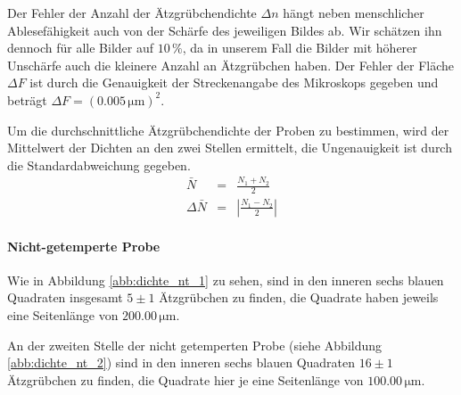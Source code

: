 \documentclass[12pt,a4paper]{scrartcl}
\numberwithin{equation}{section} %
\begin{document}
Der Fehler der Anzahl der Ätzgrübchendichte $\Delta n$ hängt neben
menschlicher Ablesefähigkeit auch von der Schärfe des jeweiligen Bildes
ab. Wir schätzen ihn dennoch für alle Bilder auf $10\,\%$, da in
unserem Fall die Bilder mit höherer Unschärfe auch die kleinere Anzahl
an Ätzgrübchen haben. Der Fehler der Fläche $\Delta F$ ist durch die
Genauigkeit der Streckenangabe des Mikroskops gegeben und beträgt
$\Delta F=(0.005 \mathrm{\, \mu m})^2$.

Um die durchschnittliche Ätzgrübchendichte der Proben zu bestimmen,
wird der Mittelwert der Dichten an den zwei Stellen ermittelt, die
Ungenauigkeit ist durch die Standardabweichung gegeben.
\begin{eqnarray}
    \bar{N} &=& \frac{N_1 + N_2}{2} \label{Nbar}\\
    \Delta \bar N &=& \left| \frac{N_1 - N_2}{2} \right| \label{DeltaNbar}
\end{eqnarray}

\hypertarget{nicht-getemperte-probe}{%
\paragraph*{Nicht-getemperte Probe}\label{nicht-getemperte-probe}}

Wie in Abbildung \ref{abb:dichte_nt_1} zu sehen, sind in den inneren sechs blauen Quadraten insgesamt $5\pm1$ Ätzgrübchen zu finden, die Quadrate haben
jeweils eine Seitenlänge von $200.00 \mathrm{\,\mu m}$.

An der zweiten Stelle der nicht getemperten Probe (siehe Abbildung
\ref{abb:dichte_nt_2}) sind in den inneren sechs blauen Quadraten $16\pm1$
Ätzgrübchen zu finden, die Quadrate hier je eine Seitenlänge von
$100.00 \mathrm{\, \mu m}$.
\end{document}
